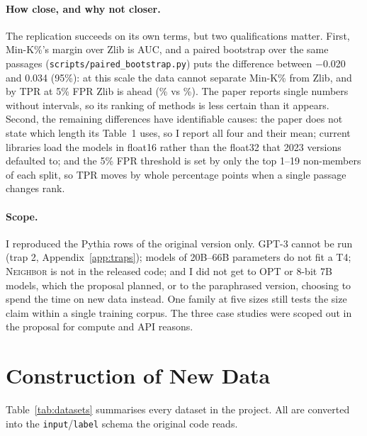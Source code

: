 \documentclass[11pt]{article}
\begin{document}
\paragraph{How close, and why not closer.} The replication succeeds on its own terms, but two qualifications matter. First, Min-K\%'s margin over Zlib is \RepMarginZlib{} AUC, and a paired bootstrap over the same passages (\texttt{scripts/paired\_bootstrap.py}) puts the difference between $-$0.020 and 0.034 (95\%): at this scale the data cannot separate Min-K\% from Zlib, and by TPR at 5\% FPR Zlib is ahead (\RepZlibTPR\% vs \RepMinKTPR\%). The paper reports single numbers without intervals, so its ranking of methods is less certain than it appears. Second, the remaining differences have identifiable causes: the paper does not state which length its Table~1 uses, so I report all four and their mean; current libraries load the models in float16 rather than the float32 that 2023 versions defaulted to; and the 5\% FPR threshold is set by only the top 1--19 non-members of each split, so TPR moves by whole percentage points when a single passage changes rank.

\paragraph{Scope.} I reproduced the Pythia rows of the original version only. GPT-3 cannot be run (trap 2, Appendix~\ref{app:traps}); models of 20B--66B parameters do not fit a T4; \textsc{Neighbor} is not in the released code; and I did not get to OPT or 8-bit 7B models, which the proposal planned, or to the paraphrased version, choosing to spend the time on new data instead. One family at five sizes still tests the size claim within a single training corpus. The three case studies were scoped out in the proposal for compute and API reasons.

\section{Construction of New Data}
\label{sec:newdata}

Table~\ref{tab:datasets} summarises every dataset in the project. All are converted into the \texttt{input}/\texttt{label} schema the original code reads.
\end{document}
